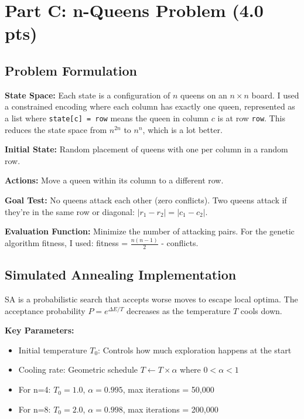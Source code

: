 \documentclass[letterpaper]{article}
\begin{document}
\section{Part C: n-Queens Problem (4.0 pts)}

\subsection{Problem Formulation}

\textbf{State Space:} Each state is a configuration of $n$ queens on an $n \times n$ board. I used a constrained encoding where each column has exactly one queen, represented as a list where \texttt{state[c] = row} means the queen in column $c$ is at row \texttt{row}. This reduces the state space from $n^{2n}$ to $n^n$, which is a lot better.

\textbf{Initial State:} Random placement of queens with one per column in a random row.

\textbf{Actions:} Move a queen within its column to a different row.

\textbf{Goal Test:} No queens attack each other (zero conflicts). Two queens attack if they're in the same row or diagonal: $|r_1 - r_2| = |c_1 - c_2|$.

\textbf{Evaluation Function:} Minimize the number of attacking pairs. For the genetic algorithm fitness, I used: fitness = $\frac{n(n-1)}{2}$ - conflicts.

\subsection{Simulated Annealing Implementation}

SA is a probabilistic search that accepts worse moves to escape local optima. The acceptance probability $P = e^{\Delta E/T}$ decreases as the temperature $T$ cools down.

\textbf{Key Parameters:}
\begin{itemize}
    \item Initial temperature $T_0$: Controls how much exploration happens at the start
    \item Cooling rate: Geometric schedule $T \leftarrow T \times \alpha$ where $0 < \alpha < 1$
    \item For n=4: $T_0 = 1.0$, $\alpha = 0.995$, max iterations = 50,000
    \item For n=8: $T_0 = 2.0$, $\alpha = 0.998$, max iterations = 200,000
\end{itemize}
\end{document}
